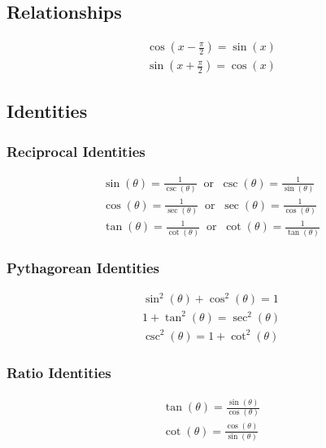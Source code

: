 \documentclass[12pt letter]{report}
\begin{document}
\chapter{}
\section{Relationships}

\begin{align*}
	\cos(x-\frac{\pi}{2}) = \sin(x) \\
	\sin(x + \frac{\pi}{2}) = \cos(x)
\end{align*}

\section{Identities}
\subsection{Reciprocal Identities}

\begin{align*}
	\sin(\theta) = \frac{1}{\csc(\theta)} \;\; \text{or} \;\; \csc(\theta) = \frac{1}{\sin(\theta)} \\[20pt]
	\cos(\theta) = \frac{1}{\sec(\theta)}\;\; \text{or} \;\;\sec(\theta) = \frac{1}{\cos(\theta)}   \\[20pt]
	\tan(\theta) = \frac{1}{\cot(\theta)}\;\; \text{or} \;\; \cot(\theta) = \frac{1}{\tan(\theta)}
\end{align*}

\subsection{Pythagorean Identities}

\begin{align*}
	\sin^2(\theta) + \cos^2(\theta) = 1 \\
	1 + \tan^2(\theta) = \sec^2(\theta) \\
	\csc^2(\theta) = 1 + \cot^2(\theta)
\end{align*}

\subsection{Ratio Identities}
\begin{align*}
	\tan(\theta) = \frac{\sin(\theta)}{\cos(\theta)} \\
	\cot(\theta) = \frac{\cos(\theta)}{\sin(\theta)}
\end{align*}
\end{document}
